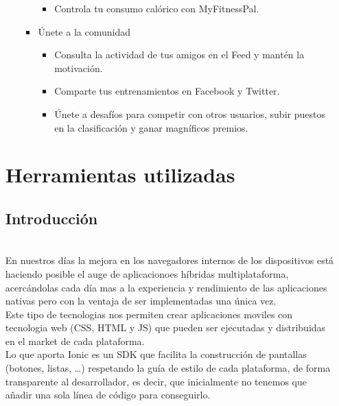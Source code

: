 \documentclass[a4paper, 11pt]{article}
\begin{document}
\begin{itemize}
\begin{itemize}
\begin{itemize}
\begin{itemize}
                                \item {Controla tu consumo calórico con MyFitnessPal.}
                              \end{itemize}
                              \item {Únete a la comunidad}
                              \begin{itemize}
                                \item {Consulta la actividad de tus amigos en el Feed y mantén la motivación.}
                                \item {Comparte tus entrenamientos en Facebook y Twitter.}
                                \item {Únete a desafíos para competir con otros usuarios, subir puestos en la clasificación y ganar magníficos premios.}
                              \end{itemize}
                            \end{itemize}
              \end{itemize}

    \section{Herramientas utilizadas}



        \subsection{Introducción}\\

              En nuestros días la mejora en los navegadores internos de los dispositivos está haciendo
              posible el auge de aplicacionoes híbridas multiplataforma, acercándolas cada día mas a
              la experiencia y rendimiento de las aplicaciones nativas pero con la ventaja de ser
              implementadas una única vez.\\


              Este tipo de tecnologias nos permiten crear aplicaciones moviles con tecnologia web
              (CSS, HTML y JS) que pueden ser ejecutadas y distribuidas en el market de cada plataforma.\\

              Lo que aporta Ionic es un SDK que facilita la construcción de pantallas (botones, listas, …)
              respetando la guía de estilo de cada plataforma, de forma transparente al desarrollador,
              es decir, que inicialmente no tenemos que añadir una sola línea de código para conseguirlo.\\


\end{itemize}
\end{document}
